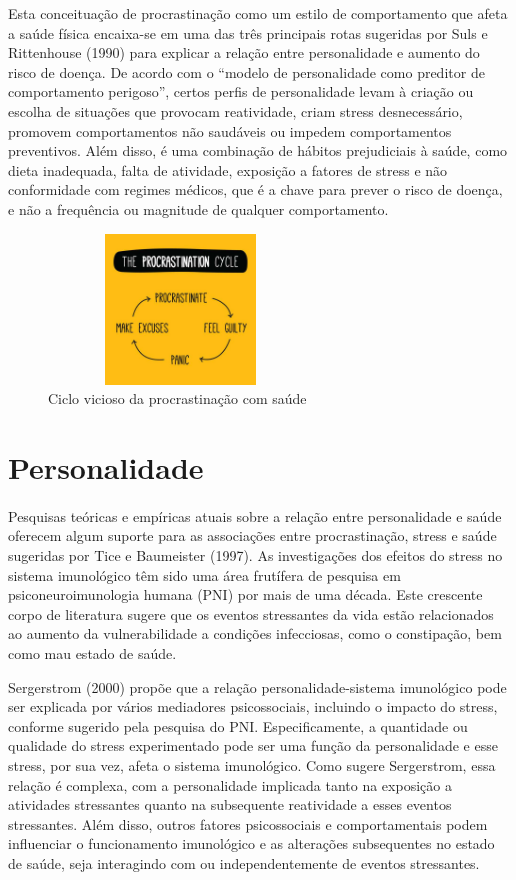 \documentclass{report}
\begin{document}
Esta conceituação de procrastinação como um estilo de comportamento que afeta a saúde física encaixa-se em uma das três principais rotas sugeridas por Suls e Rittenhouse (1990) para explicar a relação entre personalidade e aumento do risco de doença. De acordo com o “modelo de personalidade como preditor de comportamento perigoso”, certos perfis de personalidade levam à criação ou escolha de situações que provocam reatividade, criam stress desnecessário, promovem comportamentos não saudáveis ou impedem comportamentos preventivos. Além disso, é uma combinação de hábitos prejudiciais à saúde, como dieta inadequada, falta de atividade, exposição a fatores de stress e não conformidade com regimes médicos, que é a chave para prever o risco de doença, e não a frequência ou magnitude de qualquer comportamento.

\vspace{5mm}
\begin{figure}[h]
\center
\includegraphics[width=7cm, height=4cm]{ligma.jpg}
\caption{Ciclo vicioso da procrastinação com saúde}
\end{figure}

\section{Personalidade}
\label{chap.personalidade}
\paragraph{}
Pesquisas teóricas e empíricas atuais sobre a relação entre personalidade e saúde oferecem algum suporte para as associações entre procrastinação, stress e saúde sugeridas por Tice e Baumeister (1997). As investigações dos efeitos do stress no sistema imunológico têm sido uma área frutífera de pesquisa em psiconeuroimunologia humana (PNI) por mais de uma década. Este crescente corpo de literatura sugere que os eventos stressantes da vida estão relacionados ao aumento da vulnerabilidade a condições infecciosas, como o constipação, bem como mau estado de saúde.

Sergerstrom (2000) propõe que a relação personalidade-sistema imunológico pode ser explicada por vários mediadores psicossociais, incluindo o impacto do stress, conforme sugerido pela pesquisa do PNI. Especificamente, a quantidade ou qualidade do stress experimentado pode ser uma função da personalidade e esse stress, por sua vez, afeta o sistema imunológico. Como sugere Sergerstrom, essa relação é complexa, com a personalidade implicada tanto na exposição a atividades stressantes quanto na subsequente reatividade a esses eventos stressantes. Além disso, outros fatores psicossociais e comportamentais podem influenciar o funcionamento imunológico e as alterações subsequentes no estado de saúde, seja interagindo com ou independentemente de eventos stressantes.
\end{document}

